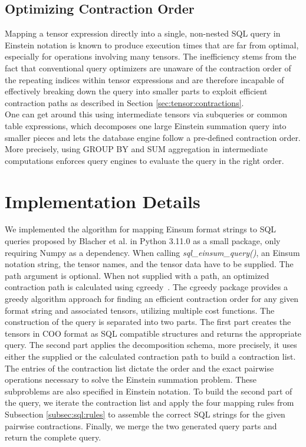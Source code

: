\subsection{Optimizing Contraction Order}
Mapping a tensor expression directly into a single, non-nested SQL query in Einstein
notation is known to produce execution times that are far from optimal, especially for operations
involving many tensors. The inefficiency stems from the fact that conventional query optimizers
are unaware of the contraction order of the repeating indices within tensor expressions and are
therefore incapable of effectively breaking down the query into smaller parts to exploit efficient
contraction paths as described in Section \ref{sec:tensor:contractions}.\\
One can get around this using intermediate tensors via subqueries or common table expressions,
which decomposes one large Einstein summation query into smaller pieces and lets the database
engine follow a pre-defined contraction order. More precisely, using GROUP BY and SUM
aggregation in intermediate computations enforces query engines to evaluate the query in the
right order.

\section{Implementation Details}
We implemented the algorithm for mapping Einsum format strings to SQL queries proposed by Blacher
et al. in Python 3.11.0 as a small package, only requiring Numpy as a dependency. When
calling \textit{sql\_einsum\_query()}, an Einsum notation string, the tensor names, and the tensor
data have to be supplied. The path argument is optional. When not supplied with a path, an
optimized contraction path is calculated using cgreedy~\cite{cgreedy}. The cgreedy package
provides a greedy algorithm approach for finding an efficient contraction order for any given
format string and associated tensors, utilizing multiple cost functions. The construction of the
query is separated into two parts. The first part creates the tensors in COO format as SQL
compatible structures and returns the appropriate query. The second part applies the decomposition
schema, more precisely, it uses either the supplied or the calculated contraction path to build a
contraction list. The entries of the contraction list dictate the order and the exact pairwise
operations necessary to solve the Einstein summation problem. These subproblems are also specified
in Einstein notation. To build the second part of the query, we iterate the contraction list and
apply the four mapping rules from Subsection \ref{subsec:sql:rules} to assemble the correct SQL
strings for the given pairwise contractions. Finally, we merge the two generated query parts and
return the complete query.

